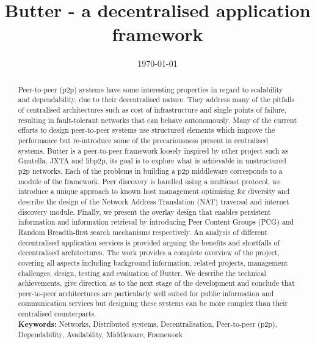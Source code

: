 \documentclass[a4paper]{report}
\title{Butter - a decentralised application framework}
\date{\today}
\begin{document}
    \maketitle

    \begin{abstract}
        Peer-to-peer (p2p) systems have some interesting properties in regard to scalability and dependability, due to
        their decentralised nature. They address many of the pitfalls of centralised architectures such as cost of
        infrastructure and single points of failure, resulting in fault-tolerant networks that can behave autonomously.
        Many of the current efforts to design peer-to-peer systems use structured elements which improve the performance
        but re-introduce some of the precariousness present in centralised systems. Butter is a peer-to-peer framework
        loosely inspired by other project such as Gnutella, JXTA and libp2p, its goal is to explore what is achievable
        in unstructured p2p networks. Each of the problems in building a p2p middleware corresponds to a module of the
        framework. Peer discovery is handled using a multicast protocol, we introduce a unique approach to known host
        management optimising for diversity and describe the design of the Network Address Translation (NAT) traversal
        and internet discovery module. Finally, we present the overlay design that enables persistent information and
        information retrieval by introducing Peer Content Groups (PCG) and Random Breadth-first search mechanisms
        respectively. An analysis of different decentralised application services is provided arguing the benefits and
        shortfalls of decentralised architectures. The work provides a complete overview of the project, covering all
        aspects including background information, related projects, management challenges, design, testing and
        evaluation of Butter. We describe the technical achievements, give direction as to the next stage of the
        development and conclude that peer-to-peer architectures are particularly well suited for public information
        and communication services but designing these systems can be more complex than their centralised counterparts.\\

        \noindent\textbf{Keywords:} Networks, Distributed systems, Decentralisation, Peer-to-peer (p2p), Dependability, Availability, Middleware, Framework
    \end{abstract}
\end{document}
